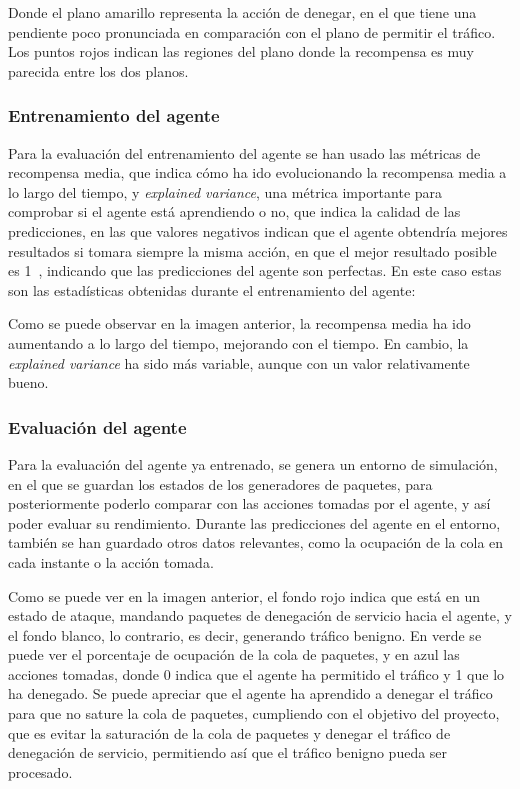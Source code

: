 Donde el plano amarillo representa la acción de denegar, en el que tiene una pendiente poco pronunciada en comparación con el plano de permitir el tráfico.
Los puntos rojos indican las regiones del plano donde la recompensa es muy parecida entre los dos planos.

\subsubsection{Entrenamiento del agente}
Para la evaluación del entrenamiento del agente se han usado las métricas de recompensa media, que indica cómo ha ido evolucionando la recompensa media a lo largo del tiempo, y \textit{explained variance}, una métrica importante para comprobar si el agente está aprendiendo o no, que indica la calidad de las predicciones, en las que valores negativos indican que el agente obtendría mejores resultados si tomara siempre la misma acción, en que el mejor resultado posible es 1~\cite{JonathanHui2023}, indicando que las predicciones del agente son perfectas. 
En este caso estas son las estadísticas obtenidas durante el entrenamiento del agente:


Como se puede observar en la imagen anterior, la recompensa media ha ido aumentando a lo largo del tiempo, mejorando con el tiempo. En cambio, la \textit{explained variance} ha sido más variable, aunque con un valor relativamente bueno.

\subsubsection{Evaluación del agente}
Para la evaluación del agente ya entrenado, se genera un entorno de simulación, en el que se guardan los estados de los generadores de paquetes, para posteriormente poderlo comparar con las acciones tomadas por el agente, y así poder evaluar su rendimiento.
Durante las predicciones del agente en el entorno, también se han guardado otros datos relevantes, como la ocupación de la cola en cada instante o la acción tomada.


Como se puede ver en la imagen anterior, el fondo rojo indica que está en un estado de ataque, mandando paquetes de denegación de servicio hacia el agente, y el fondo blanco, lo contrario, es decir, generando tráfico benigno. En verde se puede ver el porcentaje de ocupación de la cola de paquetes, y en azul las acciones tomadas, donde 0 indica que el agente ha permitido el tráfico y 1 que lo ha denegado. Se puede apreciar que el agente ha aprendido a denegar el tráfico para que no sature la cola de paquetes, cumpliendo con el objetivo del proyecto, que es evitar la saturación de la cola de paquetes y denegar el tráfico de denegación de servicio, permitiendo así que el tráfico benigno pueda ser procesado.

